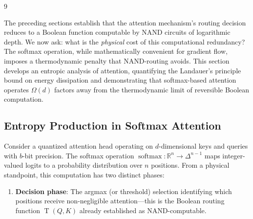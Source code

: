 \documentclass[11pt]{article}
\theoremstyle{definition}
\newcommand{\RR}{\mathbb{R}}
\newcommand{\softmax}{\operatorname{softmax}}
\newcommand{\threshold}{\operatorname{T}}
\begin{document}
\begin{thebibliography}{9}
{{{The preceding sections establish that the attention mechanism's routing decision reduces to a Boolean function computable by NAND circuits of logarithmic depth. We now ask: what is the \emph{physical} cost of this computational redundancy? The softmax operation, while mathematically convenient for gradient flow, imposes a thermodynamic penalty that NAND-routing avoids. This section develops an entropic analysis of attention, quantifying the Landauer's principle bound on energy dissipation and demonstrating that softmax-based attention operates $\Omega(d)$ factors away from the thermodynamic limit of reversible Boolean computation.













\subsection{Entropy Production in Softmax Attention}













Consider a quantized attention head operating on $d$-dimensional keys and queries with $b$-bit precision. The softmax operation $\softmax : \RR^n \to \Delta^{n-1}$ maps integer-valued logits to a probability distribution over $n$ positions. From a physical standpoint, this computation has two distinct phases:













\begin{enumerate}






    \item \textbf{Decision phase}: The argmax (or threshold) selection identifying which positions receive non-negligible attention—this is the Boolean routing function $\threshold(Q,K)$ already established as NAND-computable.







\end{enumerate}}}}
\end{thebibliography}
\end{document}
